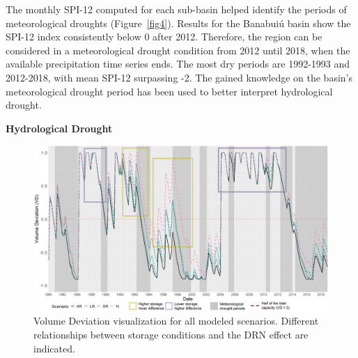 \documentclass[draft]{agujournal2019}
\begin{document}
The monthly SPI-12 computed for each sub-basin helped identify the periods of meteorological droughts (Figure~\ref{fig4}). Results for the Banabuiú basin show the SPI-12 index consistently below 0 after 2012. Therefore, the region can be considered in a meteorological drought condition from 2012 until 2018, when the available precipitation time series ends. The most dry periods are 1992-1993 and 2012-2018, with mean SPI-12 surpassing -2. The gained knowledge on the basin’s meteorological drought period has been used to better interpret hydrological drought.

\textbf{Hydrological Drought}

\begin{figure}
 \noindent\includegraphics[width=\textwidth]{images/Figure_5.png}
 \caption{Volume Deviation visualization for all modeled scenarios. Different relationships between storage conditions and the DRN effect are indicated.}
 \label{fig5}
\end{figure}
\end{document}
